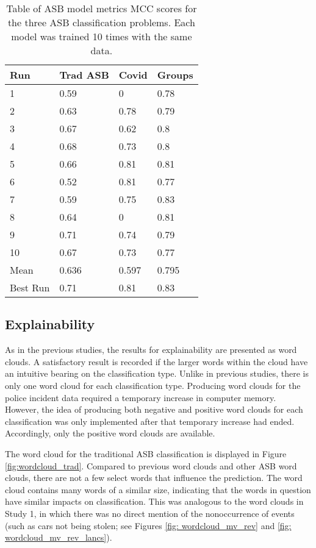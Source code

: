 \begin{table}[h]
\centering
\begin{tabular}{@{}llll@{}}
\toprule
Run      & Trad ASB & Covid & Groups \\ \midrule
1        & 0.59     & 0     & 0.78   \\
2        & 0.63     & 0.78  & 0.79   \\
3        & 0.67     & 0.62  & 0.8    \\
4        & 0.68     & 0.73  & 0.8    \\
5        & 0.66     & 0.81  & 0.81   \\
6        & 0.52     & 0.81  & 0.77   \\
7        & 0.59     & 0.75  & 0.83   \\
8        & 0.64     & 0     & 0.81   \\
9        & 0.71     & 0.74  & 0.79   \\
10       & 0.67     & 0.73  & 0.77   \\
Mean     & 0.636    & 0.597 & 0.795  \\
Best Run & 0.71     & 0.81  & 0.83   \\ \bottomrule
\end{tabular}
    \caption[Table of ASB model metrics]{{Table of ASB model metrics} MCC scores for the three ASB classification problems. Each model was trained 10 times with the same data.}
    \label{tab: asb_metrics}
\end{table}

\subsection{Explainability} As in the previous studies, the results for explainability are presented as word clouds. A satisfactory result is recorded if the larger words within the cloud have an intuitive bearing on the classification type. Unlike in previous studies, there is only one word cloud for each classification type. Producing word clouds for the police incident data required a temporary increase in computer memory. However, the idea of producing both negative and positive word clouds for each classification was only implemented after that temporary increase had ended. Accordingly, only the positive word clouds are available.

The word cloud for the traditional ASB classification is displayed in Figure \ref{fig:wordcloud_trad}. Compared to previous word clouds and other ASB word clouds, there are not a few select words that influence the prediction. The word cloud contains many words of a similar size, indicating that the words in question have similar impacts on classification. This was analogous to the word clouds in Study 1, in which there was no direct mention of the nonoccurrence of events (such as cars not being stolen; see Figures \ref{fig: wordcloud_mv_rev} and \ref{fig: wordcloud_mv_rev_lancs}).

